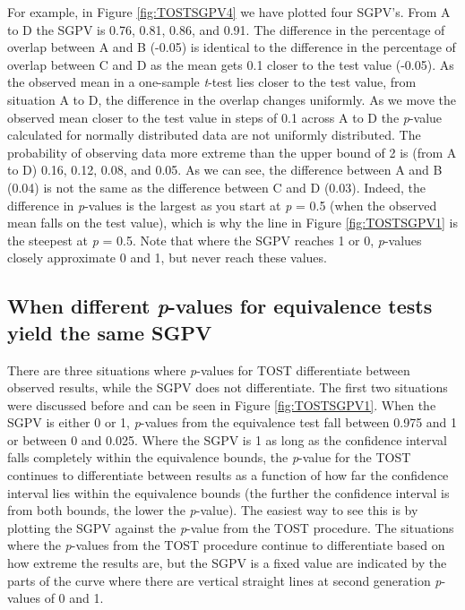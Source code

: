 \documentclass[,man,floatsintext]{apa6}
\begin{document}
For example, in Figure \ref{fig:TOSTSGPV4} we have plotted four SGPV's. From A to D the SGPV is 0.76, 0.81, 0.86, and 0.91. The difference in the percentage of overlap between A and B (-0.05) is identical to the difference in the percentage of overlap between C and D as the mean gets 0.1 closer to the test value (-0.05).
As the observed mean in a one-sample \emph{t}-test lies closer to the test value, from situation A to D, the difference in the overlap changes uniformly.
As we move the observed mean closer to the test value in steps of 0.1 across A to D the \emph{p}-value calculated for normally distributed data are not uniformly distributed. The probability of observing data more extreme than the upper bound of 2 is (from A to D) 0.16, 0.12, 0.08, and 0.05. As we can see, the difference between A and B (0.04) is not the same as the difference between C and D (0.03). Indeed, the difference in \emph{p}-values is the largest as you start at \emph{p} = 0.5 (when the observed mean falls on the test value), which is why the line in Figure \ref{fig:TOSTSGPV1} is the steepest at \emph{p} = 0.5. Note that where the SGPV reaches 1 or 0, \emph{p}-values closely approximate 0 and 1, but never reach these values.

\hypertarget{when-different-p-values-for-equivalence-tests-yield-the-same-sgpv}{%
\subsection{\texorpdfstring{When different \emph{p}-values for equivalence tests yield the same SGPV}{When different p-values for equivalence tests yield the same SGPV}}\label{when-different-p-values-for-equivalence-tests-yield-the-same-sgpv}}

There are three situations where \emph{p}-values for TOST differentiate between observed results, while the SGPV does not differentiate. The first two situations were discussed before and can be seen in Figure \ref{fig:TOSTSGPV1}. When the SGPV is either 0 or 1, \emph{p}-values from the equivalence test fall between 0.975 and 1 or between 0 and 0.025. Where the SGPV is 1 as long as the confidence interval falls completely within the equivalence bounds, the \emph{p}-value for the TOST continues to differentiate between results as a function of how far the confidence interval lies within the equivalence bounds (the further the confidence interval is from both bounds, the lower the \emph{p}-value). The easiest way to see this is by plotting the SGPV against the \emph{p}-value from the TOST procedure. The situations where the \emph{p}-values from the TOST procedure continue to differentiate based on how extreme the results are, but the SGPV is a fixed value are indicated by the parts of the curve where there are vertical straight lines at second generation \emph{p}-values of 0 and 1.
\end{document}
